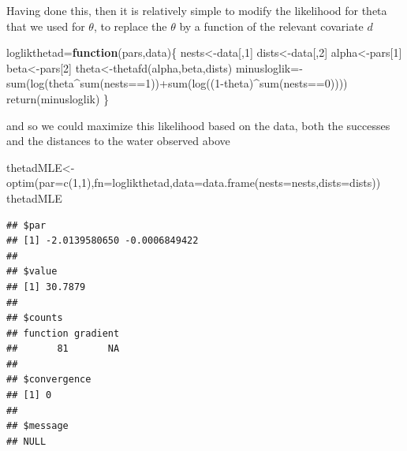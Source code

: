 \documentclass[
]{book}
\newenvironment{Shaded}{\begin{snugshade}}{\end{snugshade}}
\newcommand{\AttributeTok}[1]{\textcolor[rgb]{0.77,0.63,0.00}{#1}}
\newcommand{\ControlFlowTok}[1]{\textcolor[rgb]{0.13,0.29,0.53}{\textbf{#1}}}
\newcommand{\DecValTok}[1]{\textcolor[rgb]{0.00,0.00,0.81}{#1}}
\newcommand{\FunctionTok}[1]{\textcolor[rgb]{0.00,0.00,0.00}{#1}}
\newcommand{\NormalTok}[1]{#1}
\newcommand{\OtherTok}[1]{\textcolor[rgb]{0.56,0.35,0.01}{#1}}
\newcommand{\SpecialCharTok}[1]{\textcolor[rgb]{0.00,0.00,0.00}{#1}}
\begin{document}
Having done this, then it is relatively simple to modify the likelihood for theta that we used for \(\theta\), to replace the \(\theta\) by a function of the relevant covariate \(d\)

\begin{Shaded}
\begin{Highlighting}[]
\NormalTok{loglikthetad}\OtherTok{=}\ControlFlowTok{function}\NormalTok{(pars,data)\{}
\NormalTok{  nests}\OtherTok{\textless{}{-}}\NormalTok{data[,}\DecValTok{1}\NormalTok{]}
\NormalTok{  dists}\OtherTok{\textless{}{-}}\NormalTok{data[,}\DecValTok{2}\NormalTok{]}
\NormalTok{  alpha}\OtherTok{\textless{}{-}}\NormalTok{pars[}\DecValTok{1}\NormalTok{]}
\NormalTok{  beta}\OtherTok{\textless{}{-}}\NormalTok{pars[}\DecValTok{2}\NormalTok{]}
\NormalTok{  theta}\OtherTok{\textless{}{-}}\FunctionTok{thetafd}\NormalTok{(alpha,beta,dists)}
\NormalTok{  minusloglik}\OtherTok{=}\SpecialCharTok{{-}}\FunctionTok{sum}\NormalTok{(}\FunctionTok{log}\NormalTok{(theta}\SpecialCharTok{\^{}}\FunctionTok{sum}\NormalTok{(nests}\SpecialCharTok{==}\DecValTok{1}\NormalTok{))}\SpecialCharTok{+}\FunctionTok{sum}\NormalTok{(}\FunctionTok{log}\NormalTok{((}\DecValTok{1}\SpecialCharTok{{-}}\NormalTok{theta)}\SpecialCharTok{\^{}}\FunctionTok{sum}\NormalTok{(nests}\SpecialCharTok{==}\DecValTok{0}\NormalTok{))))}
  \FunctionTok{return}\NormalTok{(minusloglik)}
\NormalTok{\}}
\end{Highlighting}
\end{Shaded}

and so we could maximize this likelihood based on the data, both the successes and the distances to the water observed above

\begin{Shaded}
\begin{Highlighting}[]
\NormalTok{thetadMLE}\OtherTok{\textless{}{-}}\FunctionTok{optim}\NormalTok{(}\AttributeTok{par=}\FunctionTok{c}\NormalTok{(}\DecValTok{1}\NormalTok{,}\DecValTok{1}\NormalTok{),}\AttributeTok{fn=}\NormalTok{loglikthetad,}\AttributeTok{data=}\FunctionTok{data.frame}\NormalTok{(}\AttributeTok{nests=}\NormalTok{nests,}\AttributeTok{dists=}\NormalTok{dists))}
\NormalTok{thetadMLE}
\end{Highlighting}
\end{Shaded}

\begin{verbatim}
## $par
## [1] -2.0139580650 -0.0006849422
## 
## $value
## [1] 30.7879
## 
## $counts
## function gradient 
##       81       NA 
## 
## $convergence
## [1] 0
## 
## $message
## NULL
\end{verbatim}
\end{document}
